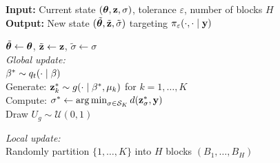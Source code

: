 \begin{algorithm}
\caption{MCMC kernel with global and local updates for permABC-SMC}
\label{alg:kernel}

\textbf{Input:} Current state $(\boldsymbol{\theta}, \mathbf{z}, \sigma)$, tolerance $\varepsilon$, number of blocks $H$ \\
\textbf{Output:} New state $(\tilde {\boldsymbol{\theta}}, \tilde {\mathbf{z}}, \tilde \sigma)$ targeting $\pi_\varepsilon(\cdot, \cdot \mid \mathbf{y})$

\BlankLine

$\tilde {\boldsymbol{\theta}} \leftarrow \boldsymbol{\theta}$, $\tilde {\mathbf{z}} \leftarrow \mathbf{z}$, $\tilde \sigma \leftarrow \sigma$ \\

\vspace{0.5em}
\textit{Global update:} \\
$\beta^* \sim q_t(\cdot \mid \beta)$ \\
Generate: $\mathbf{z}_k^* \sim g(\cdot \mid \beta^*, \mu_k)$ for $k = 1, \dots, K$ \\
Compute: $\sigma^* \leftarrow \operatorname*{arg\,min}_{\sigma \in \mathcal{S}_K} d(\mathbf{z}^*_\sigma, \mathbf{y})$ \\
Draw $U_g \sim \mathcal{U}(0,1)$ \\

\vspace{0.5em}
\textit{Local update:} \\
Randomly partition $\{1, \dots, K\}$ into $H$ blocks $(B_1, \dots, B_H)$ \\

\end{algorithm}
